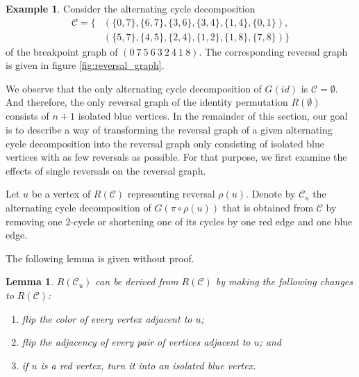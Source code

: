\documentclass[11pt,DIV=11]{scrartcl}
\def\padding{\vspace{2em}}
\newtheorem{lemma}[theorem]{Lemma}
\theoremstyle{definition}
\newtheorem{example}{Example}[theorem]
\theoremstyle{remark}
\begin{document}
\begin{example}
Consider the alternating cycle decomposition
\begin{align*}
    \mathcal{C} = \{&(\{0,7\},\{6,7\},\{3,6\},\{3,4\},\{1,4\},\{0,1\}), \\
                    &(\{5,7\},\{4,5\},\{2,4\},\{1,2\},\{1,8\},\{7,8\})\}
\end{align*}
of the breakpoint graph of $(0\ 7\ 5\ 6\ 3\ 2\ 4\ 1\ 8)$. The corresponding reversal graph is given in figure \ref{fig:reversal_graph}.
\end{example}

We observe that the only alternating cycle decomposition of $G(id)$ is $\mathcal{C} = \emptyset$. And therefore, the only reversal graph of the identity permutation $R(\emptyset)$ consists of $n+1$ isolated blue vertices. In the remainder of this section, our goal is to describe a way of transforming the reversal graph of a given alternating cycle decomposition into the reversal graph only consisting of isolated blue vertices with as few reversals as possible. For that purpose, we first examine the effects of single reversals on the reversal graph.\padding

Let $u$ be a vertex of $R(\mathcal{C})$ representing reversal $\rho(u)$. Denote by $\mathcal{C}_u$ the alternating cycle decomposition of $G(\pi \circ \rho(u))$ that is obtained from $\mathcal{C}$ by removing one 2-cycle or shortening one of its cycles by one red edge and one blue edge.

The following lemma is given without proof.

\begin{lemma}
\label{lem:3}
$R(\mathcal{C}_u)$ can be derived from $R(\mathcal{C})$ by making the following changes to $R(\mathcal{C})$:
\begin{enumerate}
    \item flip the color of every vertex adjacent to $u$;
    \item flip the adjacency of every pair of vertices adjacent to $u$; and
    \item if $u$ is a red vertex, turn it into an isolated blue vertex.
\end{enumerate}
\end{lemma}
\end{document}
